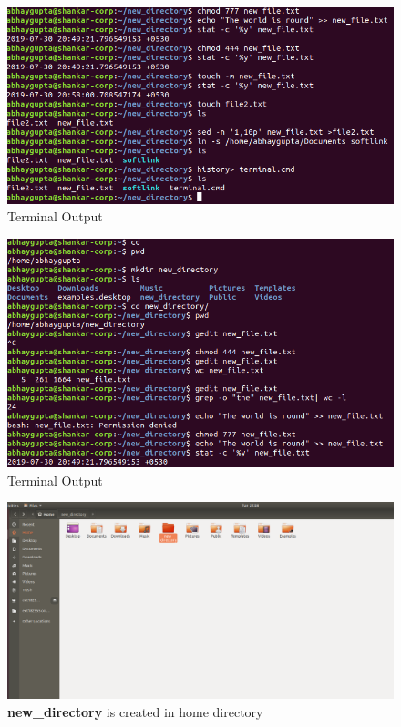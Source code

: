\documentclass[12pt,a4paper]{article}
\begin{document}
			\begin{figure}[h!]
				\centering
				\caption{Terminal Output}
				\includegraphics[scale=.5]{2.png}
			\end{figure}
			\begin{figure}[h!]
				\centering
				\caption{Terminal Output}
				\includegraphics[scale=.5]{1.png}
			\end{figure}
				\begin{figure}[h!]
				\centering
				\caption{\textbf{new\_directory} is created in home directory}
				\includegraphics[scale=.25]{home.png}
			\end{figure}
\end{document}
